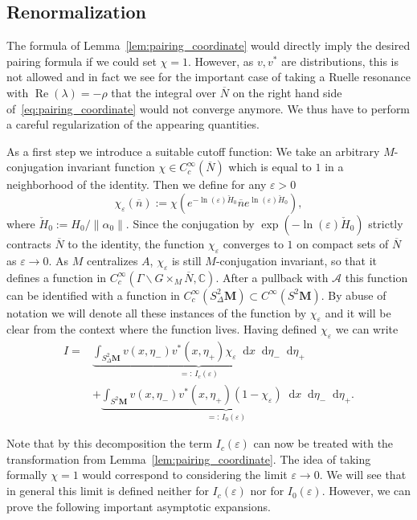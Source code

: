 \documentclass[10pt]{amsart}
\theoremstyle{definition}
\DeclareMathOperator{\Real}{Re}
\newcommand{\cc}{\mathbb{C}}
\let\Re=\Real
\renewcommand{\Re}{\operatorname{Re}}
\newcommand{\intd}{\mathop{}\!\mathrm{d}}
\newcommand{\bn}{{\overline{n}}}
\newcommand{\bN}{{\overline{N}}}
\newcommand{\cH}{{\check{H}_0}}
\begin{document}
\subsection{Renormalization}
The formula of Lemma~\ref{lem:pairing_coordinate} would directly imply the desired pairing formula if we could set $\chi=1$. However, as $v,v^*$ are distributions, this is not allowed and in fact we see for the important case of taking a Ruelle resonance with $\Re(\lambda)=-\rho$ that the integral over $\bN$ on the right hand side of~\eqref{eq:pairing_coordinate} would not converge anymore. We thus have to perform a careful regularization of the appearing quantities.

As a first step we introduce a suitable cutoff function: We take an arbitrary $M$-conjugation invariant function $\chi\in C_c^\infty(\bN)$ which is equal to $1$ in a neighborhood of the identity. Then we define for any $\varepsilon>0$
\[
\chi_\varepsilon(\bn) := \chi\left(e^{-\ln(\varepsilon)\cH}\bn e^{\ln(\varepsilon)\cH}\right),
\]
where $\check H_0:= H_0/\|\alpha_0\|$. Since the conjugation by $\exp({-\ln(\varepsilon)\cH})$ strictly contracts $\bN$ to the identity, the function $\chi_\varepsilon$ converges to $1$ on compact sets of $\bN$ as $\varepsilon \to 0$. As $M$ centralizes $A$, $\chi_\varepsilon$ is still $M$-conjugation invariant, so that it defines a function in $C_c^\infty(\Gamma\backslash G\times_M \bN, \cc)$. After a pullback with $\mathcal A$ this function can be identified with a function in $C_c^ \infty(S^2_\Delta\mathbf M)\subset C^\infty(S^2\mathbf M)$. By abuse of notation we will denote all these instances of the function by $\chi_\varepsilon$ and it will be clear from the context where the function lives. Having defined $\chi_\varepsilon$ we can write
\begin{align*}
I= & \underbrace{\int_{S^2_\Delta\mathbf M} v(x,\eta_-)v^*(x,\eta_+) \chi_\varepsilon \intd x\intd
\eta_-\intd \eta_+}_{=:\,I_c(\varepsilon)} \\
& +\underbrace{\int_{S^2\mathbf M} v(x,\eta_-)v^*(x,\eta_+) (1- \chi_\varepsilon) \intd x\intd
\eta_-\intd \eta_+}_{=:\,I_0(\varepsilon)}.
\end{align*}

Note that by this decomposition the term $I_c(\varepsilon)$ can now be treated with the transformation from Lemma~\ref{lem:pairing_coordinate}. The idea of taking formally $\chi=1$ would correspond to considering the limit $\varepsilon\to 0$. We will see that in general this limit is defined neither for $I_c(\varepsilon)$ nor for $I_0(\varepsilon)$. However, we can prove the following important asymptotic expansions.
\end{document}
